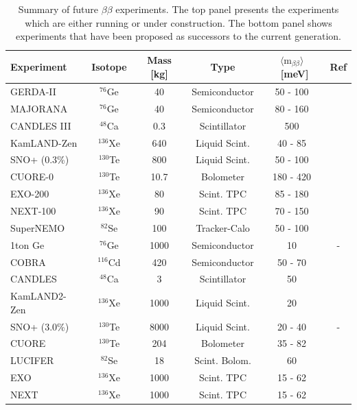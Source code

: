 \documentclass[main.tex]{subfiles}
\begin{document}
\begin{table}
\centering
\begin{tabular}{lccccc}
\toprule
Experiment & Isotope & Mass [kg] & Type & $ \langle \text{m}_{\beta\beta} \rangle$~[meV] & Ref \\ 
\midrule
GERDA-II     & $^{\text{76}}$Ge  & 40   & Semiconductor & 50 - 100  & \cite{GERDA}        \\
MAJORANA     & $^{\text{76}}$Ge  & 40   & Semiconductor & 80 - 160  & \cite{MAJORANA}     \\
CANDLES III  & $^{\text{48}}$Ca  & 0.3  & Scintillator  & 500       & \cite{CANDLESIII}   \\
KamLAND-Zen  & $^{\text{136}}$Xe & 640  & Liquid Scint. & 40 - 85   & \cite{KamLAND-Zen3} \\
SNO+ (0.3\%) & $^{\text{130}}$Te & 800  & Liquid Scint. & 50 - 100  &  \\
CUORE-0      & $^{\text{130}}$Te & 10.7 & Bolometer     & 180 - 420 & \cite{CUORE}        \\
EXO-200      & $^{\text{136}}$Xe & 80   & Scint. TPC    & 85 - 180  & \cite{EXO-200}      \\
NEXT-100     & $^{\text{136}}$Xe & 90   & Scint. TPC    & 70 - 150  & \cite{NEXT}         \\
SuperNEMO    & $^{\text{82}}$Se  & 100  & Tracker-Calo  & 50 - 100  &  \\
\midrule
1ton Ge      & $^{\text{76}}$Ge  & 1000 & Semiconductor & 10        & - \\
COBRA        & $^{\text{116}}$Cd & 420  & Semiconductor & 50 - 70   & \cite{COBRA}        \\
CANDLES      & $^{\text{48}}$Ca  & 3    & Scintillator  & 50        & \cite{CANDLESIII}   \\
KamLAND2-Zen & $^{\text{136}}$Xe & 1000 & Liquid Scint. & 20        & \cite{KamLAND-Zen3} \\
SNO+ (3.0\%) & $^{\text{130}}$Te & 8000 & Liquid Scint. & 20 - 40   & - \\
CUORE        & $^{\text{130}}$Te & 204  & Bolometer     & 35 - 82   & \cite{CUORE}        \\
LUCIFER      & $^{\text{82}}$Se  & 18   & Scint. Bolom. & 60        & \cite{LUCIFER}      \\
EXO          & $^{\text{136}}$Xe & 1000 & Scint. TPC    & 15 - 62   & \cite{EXO-200}      \\
NEXT         & $^{\text{136}}$Xe & 1000 & Scint. TPC    & 15 - 62   & \cite{NEXT}         \\
\bottomrule
\end{tabular}
\caption{Summary of future $\beta\beta$ experiments. The top panel presents the experiments which are either running or under construction. The bottom panel shows experiments that have been proposed as successors to the current generation.}
\label{tab:futureBBexperiment}
\end{table}
\end{document}
